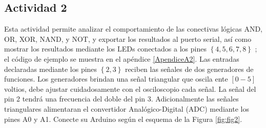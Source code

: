 \subsection{Actividad 2}

Esta actividad permite analizar el comportamiento de las conectivas lógicas  AND, OR, XOR, NAND, y NOT, y exportar los resultados al puerto serial, así como mostrar los resultados mediante los LEDs conectados a los pines $\left\lbrace4, 5, 6, 7, 8 \right\rbrace$ ; el código de ejemplo se muestra en el apéndice \ref{ApendiceA2}. 
Las entradas declaradas mediante los pines $\left\lbrace2, 3 \right\rbrace$ reciben las señales de dos generadores de funciones. 
Los generadores brindan una señal triangular que oscila ente $[0-5]$ voltios, debe ajustar cuidadosamente con el osciloscopio cada señal. 
La señal del pin 2 tendrá una frecuencia del doble del pin 3. Adicionalmente las señales  triangulares alimentaran el convertidor Analógico-Digital (ADC) mediante los pines A0 y A1. 
Conecte su Arduino según el esquema de la Figura \ref{fig:fig2}.  

